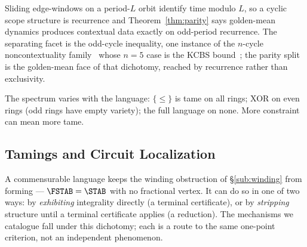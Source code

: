 \begin{remark}\label{rem:parity-dynamics}
Sliding edge-windows on a period-$L$ orbit identify time modulo $L$, so a cyclic
scope structure is recurrence and Theorem~\ref{thm:parity} says golden-mean
dynamics produces contextual data exactly on odd-period recurrence. The separating
facet is the odd-cycle inequality, one instance of the $n$-cycle noncontextuality
family~\cite{AraujoQuintinoBudroniTerraCunhaCabello2013} whose $n=5$ case is the
KCBS bound~\cite{KCBS2008}; the parity split is the golden-mean face of that
dichotomy, reached by recurrence rather than exclusivity.
\end{remark}

The spectrum varies with the language: $\{\le\}$ is tame on all rings; XOR on even
rings (odd rings have empty variety); the full language on none. More constraint
can mean more tame.


\subsection{Tamings and Circuit Localization}\label{sub:tamings}

A commensurable language keeps the winding obstruction of \S\ref{sub:winding} from
forming --- $\FSTAB=\STAB$ with no fractional vertex. It can do so in one of two
ways: by \emph{exhibiting} integrality directly (a terminal certificate), or by
\emph{stripping} structure until a terminal certificate applies (a reduction). The
mechanisms we catalogue fall under this dichotomy; each is a route to the same
one-point criterion, not an independent phenomenon.

